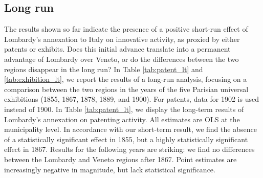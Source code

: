 

\subsection{Long run}

The results shown so far indicate the presence of a positive short-run effect of Lombardy's annexation to Italy on innovative activity, as proxied by either patents or exhibits. 
Does this initial advance translate into a permanent advantage of Lombardy over Veneto, or do the differences between the two regions disappear in the long run?
In Table \ref{tab:patent_lt} and \ref{tab:exhibition_lt}, we report the results of a long-run analysis, focusing on a comparison between the two regions in the years of the five Parisian universal exhibitions (1855, 1867, 1878, 1889, and 1900). For patents, data for 1902 is used instead of 1900. 
In Table \ref{tab:patent_lt}, we display the long-term results of Lombardy's annexation on patenting activity. 
All estimates are OLS at the municipality level.
In accordance with our short-term result, we find the absence of a statistically significant effect in 1855, but a highly statistically significant effect in 1867. 
Results for the following years are striking: we find no differences between the Lombardy and Veneto regions after 1867. 
Point estimates are increasingly negative in magnitude, but lack statistical significance. 

